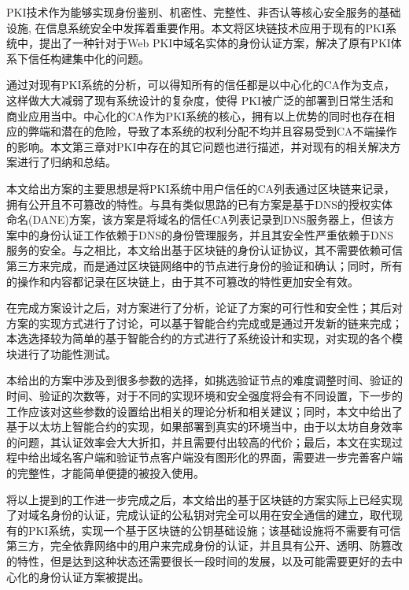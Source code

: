 



PKI技术作为能够实现身份鉴别、机密性、完整性、非否认等核心安全服务的基础设施, 在信息系统安全中发挥着重要作用。本文将区块链技术应用于现有的PKI系统中，提出了一种针对于Web PKI中域名实体的身份认证方案，解决了原有PKI体系下信任构建集中化的问题。

通过对现有PKI系统的分析，可以得知所有的信任都是以中心化的CA作为支点，这样做大大减弱了现有系统设计的复杂度，使得
PKI被广泛的部署到日常生活和商业应用当中。中心化的CA作为PKI系统的核心，拥有以上优势的同时也存在相应的弊端和潜在的危险，导致了本系统的权利分配不均并且容易受到CA不端操作的影响。本文第三章对PKI中存在的其它问题也进行描述，并对现有的相关解决方案进行了归纳和总结。


本文给出方案的主要思想是将PKI系统中用户信任的CA列表通过区块链来记录，拥有公开且不可篡改的特性。与具有类似思路的已有方案是基于DNS的授权实体命名(DANE)方案，该方案是将域名的信任CA列表记录到DNS服务器上，但该方案中的身份认证工作依赖于DNS的身份管理服务，并且其安全性严重依赖于DNS服务的安全。与之相比，本文给出基于区块链的身份认证协议，其不需要依赖可信第三方来完成，而是通过区块链网络中的节点进行身份的验证和确认；同时，所有的操作和内容都记录在区块链上，由于其不可篡改的特性更加安全有效。

在完成方案设计之后，对方案进行了分析，论证了方案的可行性和安全性；其后对方案的实现方式进行了讨论，可以基于智能合约完成或是通过开发新的链来完成；本选选择较为简单的基于智能合约的方式进行了系统设计和实现，对实现的各个模块进行了功能性测试。


本给出的方案中涉及到很多参数的选择，如挑选验证节点的难度调整时间、验证的时间、验证的次数等，对于不同的实现环境和安全强度将会有不同设置，下一步的工作应该对这些参数的设置给出相关的理论分析和相关建议；同时，本文中给出了基于以太坊上智能合约的实现，如果部署到真实的环境当中，由于以太坊自身效率的问题，其认证效率会大大折扣，并且需要付出较高的代价；最后，本文在实现过程中给出域名客户端和验证节点客户端没有图形化的界面，需要进一步完善客户端的完整性，才能简单便捷的被投入使用。

将以上提到的工作进一步完成之后，本文给出的基于区块链的方案实际上已经实现了对域名身份的认证，完成认证的公私钥对完全可以用在安全通信的建立，取代现有的PKI系统，实现一个基于区块链的公钥基础设施；该基础设施将不需要有可信第三方，完全依靠网络中的用户来完成身份的认证，并且具有公开、透明、防篡改的特性，但是达到这种状态还需要很长一段时间的发展，以及可能需要更好的去中心化的身份认证方案被提出。







